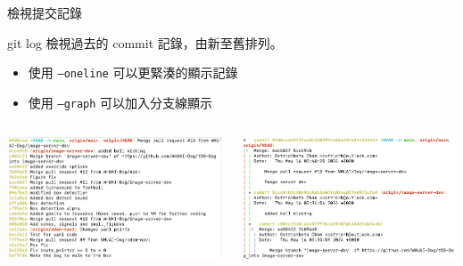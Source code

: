 \documentclass[xetex, unicode, 10pt, aspectratio=169]{beamer}
\begin{document}
\begin{frame}{檢視提交記錄}
    \begin{block}{git log}
        檢視過去的 commit 記錄，由新至舊排列。

        \begin{itemize}
            \item 使用 \texttt{--oneline} 可以更緊湊的顯示記錄
            \item 使用 \texttt{--graph} 可以加入分支線顯示
        \end{itemize}
        \begin{columns}
            \begin{column}{0.5\textwidth}
                \begin{center}
                    \includegraphics[width=2.5in]{./img/git-log-oneline.png}
                \end{center}
            \end{column}
            \begin{column}{0.5\textwidth}
                \begin{center}
                    \includegraphics[width=2.5in]{./img/git-log-graph.png}
                \end{center}
            \end{column}
        \end{columns}
    \end{block}
\end{frame}
\end{document}
